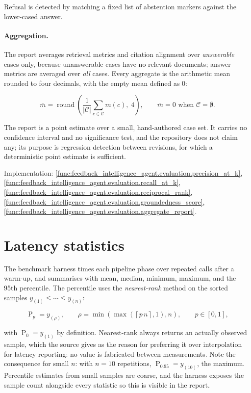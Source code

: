 Refusal is detected by matching a fixed list of abstention markers against the
lower-cased answer.

\paragraph{Aggregation.}
The report averages retrieval metrics and citation alignment over
\emph{answerable} cases only, because unanswerable cases have no relevant
documents; answer metrics are averaged over \emph{all} cases. Every aggregate
is the arithmetic mean rounded to four decimals, with the empty mean defined as
$0$:

\begin{equation}
\overline{m} = \operatorname{round}\!\left(\frac{1}{|\mathcal{C}|}
  \sum_{c \in \mathcal{C}} m(c),\; 4\right),
\qquad \overline{m} = 0 \text{ when } \mathcal{C} = \emptyset .
\end{equation}

The report is a point estimate over a small, hand-authored case set. It carries
no confidence interval and no significance test, and the repository does not
claim any; its purpose is regression detection between revisions, for which a
deterministic point estimate is sufficient.

\medskip\noindent
Implementation: \cref{func:feedback_intelligence_agent.evaluation.precision_at_k},
\cref{func:feedback_intelligence_agent.evaluation.recall_at_k},
\cref{func:feedback_intelligence_agent.evaluation.reciprocal_rank},
\cref{func:feedback_intelligence_agent.evaluation.groundedness_score},
\cref{func:feedback_intelligence_agent.evaluation.aggregate_report}.

\section{Latency statistics}
\label{sec:math-latency}

The benchmark harness times each pipeline phase over repeated calls after a
warm-up, and summarises with mean, median, minimum, maximum, and the 95th
percentile. The percentile uses the \emph{nearest-rank} method on the sorted
samples $y_{(1)} \leq \cdots \leq y_{(n)}$:

\begin{equation}
\operatorname{P}_{p} = y_{(\rho)},
\qquad
\rho = \min\!\left(\max\!\left(\left\lceil p\,n \right\rceil, 1\right), n\right),
\qquad p \in [0,1],
\end{equation}

with $\operatorname{P}_0 = y_{(1)}$ by definition. Nearest-rank always returns
an actually observed sample, which the source gives as the reason for
preferring it over interpolation for latency reporting: no value is fabricated
between measurements. Note the consequence for small $n$: with $n = 10$
repetitions, $\operatorname{P}_{0.95} = y_{(10)}$, the maximum. Percentile
estimates from small samples are coarse, and the harness exposes the sample
count alongside every statistic so this is visible in the report.

